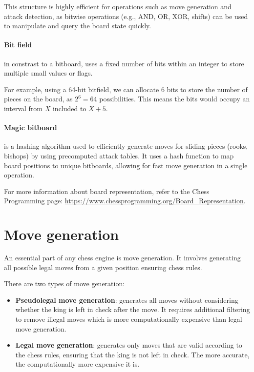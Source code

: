 \noindent This structure is highly efficient for operations such as move generation and attack detection, as bitwise operations (e.g., AND, OR, XOR, shifts) can be used to manipulate and query the board state quickly.

\paragraph{Bit field} in constrast to a bitboard, uses a fixed number of bits within an integer to store multiple small values or flags.

\vspace{1em}

\noindent For example, using a 64-bit bitfield, we can allocate 6 bits to store the number of pieces on the board, as $2^6 = 64$ possibilities. This means the bits would occupy an interval from $X$ included to $X+5$.

\paragraph{Magic bitboard} is a hashing algorithm used to efficiently generate moves for sliding pieces (rooks, bishops) by using precomputed attack tables. It uses a hash function to map board positions to unique bitboards, allowing for fast move generation in a single operation.

\vspace{1em}

\noindent For more information about board representation, refer to the Chess Programming page: \url{https://www.chessprogramming.org/Board_Representation}.

\section{Move generation}
\label{sec:move-generation}

An essential part of any chess engine is move generation. It involves generating all possible legal moves from a given position ensuring chess rules.

\vspace{1em}

\noindent There are two types of move generation:

\begin{itemize}
    \item \textbf{Pseudolegal move generation}: generates all moves without considering whether the king is left in check after the move. It requires additional filtering to remove illegal moves which is more computationally expensive than legal move generation.
    \item \textbf{Legal move generation}: generates only moves that are valid according to the chess rules, ensuring that the king is not left in check. The more accurate, the computationally more expensive it is.
\end{itemize}

